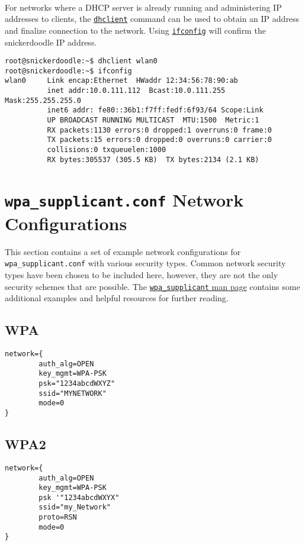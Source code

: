 ~\\
\noindent
For networks where a DHCP server is already running and administering IP addresses to clients, the \href{http://linux.die.net/man/8/dhclient}{\texttt{dhclient}} command can be used to obtain an IP address and finalize connection to the network. Using \href{http://linux.die.net/man/8/ifconfig}{\texttt{ifconfig}} will confirm the snickerdoodle IP address.
                                                                
\begin{lstlisting}
root@snickerdoodle:~$ dhclient wlan0
root@snickerdoodle:~$ ifconfig
wlan0     Link encap:Ethernet  HWaddr 12:34:56:78:90:ab  
          inet addr:10.0.111.112  Bcast:10.0.111.255  Mask:255.255.255.0
          inet6 addr: fe80::36b1:f7ff:fedf:6f93/64 Scope:Link
          UP BROADCAST RUNNING MULTICAST  MTU:1500  Metric:1
          RX packets:1130 errors:0 dropped:1 overruns:0 frame:0
          TX packets:15 errors:0 dropped:0 overruns:0 carrier:0
          collisions:0 txqueuelen:1000 
          RX bytes:305537 (305.5 KB)  TX bytes:2134 (2.1 KB)
\end{lstlisting}


\section{\texttt{wpa\_supplicant.conf} Network Configurations}
\label{sec:wpaconftypes}
This section contains a set of example network configurations for \texttt{wpa\_supplicant.conf} with various security types. Common network security types have been chosen to be included here, however, they are not the only security schemes that are possible. The \href{http://linux.die.net/man/5/wpa_supplicant.conf}{\texttt{wpa\_supplicant} man page} contains some additional examples and helpful resources for further reading.

\newpage
\subsection{WPA}
\begin{lstlisting}[style=text]
network={
        auth_alg=OPEN
        key_mgmt=WPA-PSK
        psk="1234abcdWXYZ"
        ssid="MYNETWORK"
        mode=0
}
\end{lstlisting}


\subsection{WPA2}
\begin{lstlisting}[style=text]
network={
        auth_alg=OPEN
        key_mgmt=WPA-PSK
        psk '"1234abcdWXYX"
        ssid="my_Network"
        proto=RSN
        mode=0
}
\end{lstlisting}


